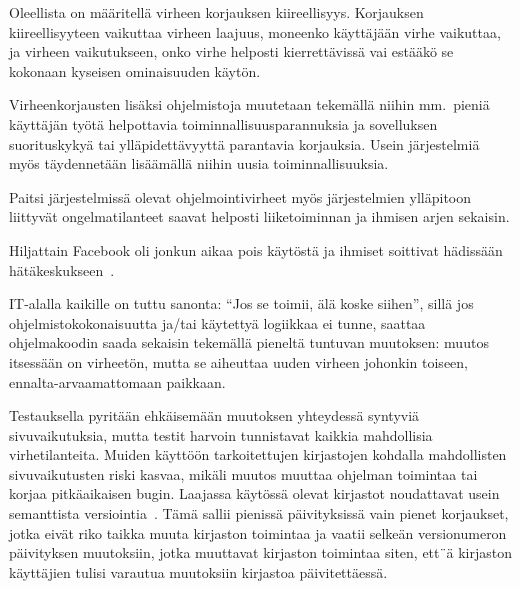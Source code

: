 \documentclass[finnish]{tktltiki2}
\theoremstyle{definition}
\theoremstyle{remark}
\begin{document}
Oleellista on määritellä virheen korjauksen kiireellisyys. Korjauksen kiireellisyyteen vaikuttaa virheen laajuus, moneenko käyttäjään virhe vaikuttaa, ja virheen vaikutukseen, onko virhe helposti kierrettävissä vai estääkö se kokonaan kyseisen ominaisuuden käytön.


Virheenkorjausten lisäksi ohjelmistoja muutetaan tekemällä niihin mm.\ pieniä käyttäjän työtä helpottavia toiminnallisuusparannuksia ja sovelluksen suorituskykyä tai ylläpidettävyyttä parantavia korjauksia. Usein järjestelmiä myös täydennetään lisäämällä niihin uusia toiminnallisuuksia.

Paitsi järjestelmissä olevat ohjelmointivirheet  myös järjestelmien ylläpitoon liittyvät ongelmatilanteet saavat helposti liiketoiminnan ja ihmisen arjen sekaisin.

Hiljattain Facebook oli jonkun aikaa pois käytöstä ja ihmiset soittivat hädissään hätäkeskukseen~\cite{facebook-down}.

IT-alalla kaikille on tuttu sanonta: ``Jos se toimii, älä koske siihen'', sillä jos ohjelmistokokonaisuutta ja/tai käytettyä logiikkaa ei tunne, saattaa ohjelmakoodin saada sekaisin tekemällä pieneltä tuntuvan muutoksen: muutos itsessään on virheetön, mutta se aiheuttaa uuden virheen johonkin toiseen, ennalta-arvaamattomaan paikkaan.

Testauksella pyritään ehkäisemään muutoksen yhteydessä syntyviä sivuvaikutuksia, mutta testit harvoin tunnistavat kaikkia mahdollisia virhetilanteita.
Muiden käyttöön tarkoitettujen kirjastojen kohdalla mahdollisten sivuvaikutusten riski kasvaa, mikäli muutos muuttaa ohjelman toimintaa tai korjaa pitkäaikaisen bugin.
Laajassa käytössä olevat kirjastot noudattavat usein semanttista versiointia~\cite{semver}. Tämä sallii pienissä päivityksissä vain pienet korjaukset, jotka eivät riko taikka muuta kirjaston toimintaa ja vaatii selkeän versionumeron päivityksen muutoksiin, jotka muuttavat kirjaston toimintaa siten, ett¨ä kirjaston käyttäjien tulisi varautua muutoksiin kirjastoa päivitettäessä.
\end{document}
